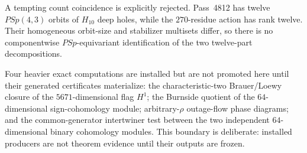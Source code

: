 A tempting count coincidence is explicitly rejected.  Pass~4812 has twelve $PSp(4,3)$ orbits of $H_{10}$ deep holes, while the $270$-residue action has rank twelve.  Their homogeneous orbit-size and stabilizer multisets differ, so there is no componentwise $PSp$-equivariant identification of the two twelve-part decompositions.

Four heavier exact computations are installed but are not promoted here until their generated certificates materialize: the characteristic-two Brauer/Loewy closure of the $5671$-dimensional flag $H^1$; the Burnside quotient of the $64$-dimensional sign-cohomology module; arbitrary-$\rho$ outage-flow phase diagrams; and the common-generator intertwiner test between the two independent $64$-dimensional binary cohomology modules.  This boundary is deliberate: installed producers are not theorem evidence until their outputs are frozen.
